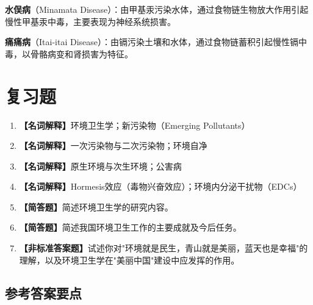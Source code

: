 \begin{keybox}
\textbf{水俣病}（Minamata Disease）：由甲基汞污染水体，通过食物链生物放大作用引起慢性甲基汞中毒，主要表现为神经系统损害。

\textbf{痛痛病}（Itai-itai Disease）：由镉污染土壤和水体，通过食物链蓄积引起慢性镉中毒，以骨骼病变和肾损害为特征。
\end{keybox}

\section{复习题}

\begin{enumerate}[leftmargin=*, itemsep=8pt]
    \item \textbf{【名词解释】}环境卫生学；新污染物（Emerging Pollutants）
    \item \textbf{【名词解释】}一次污染物与二次污染物；环境自净
    \item \textbf{【名词解释】}原生环境与次生环境；公害病
    \item \textbf{【名词解释】}Hormesis效应（毒物兴奋效应）；环境内分泌干扰物（EDCs）
    \item \textbf{【简答题】}简述环境卫生学的研究内容。
    \item \textbf{【简答题】}简述我国环境卫生工作的主要成就及今后任务。
    \item \textbf{【非标准答案题】}试述你对"环境就是民生，青山就是美丽，蓝天也是幸福"的理解，以及环境卫生学在"美丽中国"建设中应发挥的作用。
\end{enumerate}

\subsection*{参考答案要点}

